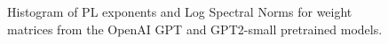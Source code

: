 \begin{figure}[hbt!] %
    \centering
    \qquad
   \caption{Histogram of PL exponents 
           and Log Spectral Norms 
           for weight matrices from the OpenAI GPT and GPT2-small pretrained models.}
   
\label{fig:GPT-hist}
\end{figure}

